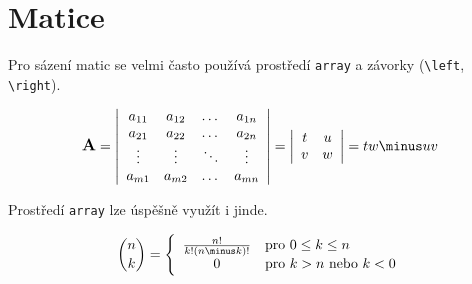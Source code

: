 \documentclass[twocolumn, 11pt, a4paper]{article}
\begin{document}
\section{Matice}
Pro sázení matic se velmi často používá prostředí \texttt{array} a závorky (\verb|\left|, \verb|\right|). 

$$
	\textbf{\large A} =
	\left|
		\begin{array}{cccc}
			a_{11} & a_{12} & \dots & a_{1n} \\
			a_{21} & a_{22} & \dots & a_{2n} \\
			\vdots & \vdots & \ddots &\vdots \\
			a_{m1} & a_{m2} & \dots & a_{mn}
		\end{array}
	\right|
	=
	\left|
		\begin{array}{cc}
			t & u \\
			v & w
		\end{array}
	\right|
	=
	tw \minus uv
$$

Prostředí \texttt{array} lze úspěšně využít i jinde.

$$
	\binom{n}{k}
	=
	\Bigg\{
		\begin{array}{c l}
			\frac{n!}{k!( n\minus k)!}	& \text{pro } 0 \leq k \leq n \\
			0							& \text{pro } k > n \text{ nebo } k < 0 
		\end{array}
$$
\end{document}
